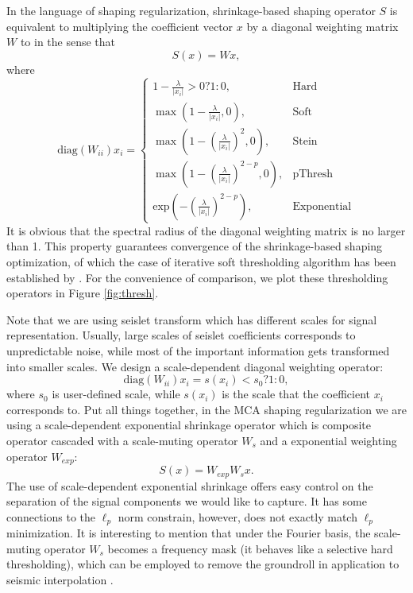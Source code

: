  In the language of shaping regularization, shrinkage-based shaping operator $S$ is equivalent to multiplying the coefficient vector $x$ by a diagonal weighting matrix $W$ to in the sense that
\begin{equation}
 S(x)=Wx,
\end{equation}
where 
\begin{equation}
 \mathrm{diag}(W_{ii})x_i=
 \begin{cases}
 1-\frac{\lambda}{|x_i|}>0?1:0, & \mathrm{Hard}\\
 \max(1-\frac{\lambda}{|x_i|},0), & \mathrm{Soft}\\
 \max(1-\left(\frac{\lambda}{|x_i|}\right)^2,0), & \mathrm{Stein}\\
 \max(1-\left(\frac{\lambda}{|x_i|}\right)^{2-p},0), & \mathrm{pThresh}\\
 \mathrm{exp}(-(\frac{\lambda}{|x_i|})^{2-p}),& \mathrm{Exponential}
 \end{cases}
\end{equation}
It is obvious that the spectral radius of the diagonal weighting matrix is no larger than 1. This property guarantees convergence of the shrinkage-based shaping optimization, of which the case of iterative soft thresholding algorithm has been established by  \cite{daubechies2004iterative}. For the convenience of comparison, we plot these thresholding operators in Figure \ref{fig:thresh}. 


Note that we are using seislet transform which has different scales for signal representation. Usually, large scales of seislet coefficients corresponds to unpredictable noise, while most of the important information gets transformed into smaller scales. We design a scale-dependent diagonal weighting operator:
\begin{equation}
 \mathrm{diag}(W_{ii})x_i= s(x_i)<s_0?1:0,
\end{equation}
where $s_0$ is user-defined scale, while $s(x_i)$ is the scale that the coefficient $x_i$ corresponds to.  Put all things together, in the MCA shaping regularization we are using a scale-dependent exponential shrinkage operator which is composite operator cascaded with a scale-muting operator $W_{s}$ and a exponential weighting operator $W_{exp}$:
\begin{equation}
 S(x)=W_{exp} W_s x.
\end{equation}
The use of scale-dependent exponential shrinkage offers easy control on the separation of the signal components we would like to capture. It has some connections to the $\ell_p$ norm constrain, however, does not exactly match $\ell_p$ minimization. It is interesting to mention that under the Fourier basis, the scale-muting operator $W_s$ becomes a frequency mask (it behaves like a selective hard thresholding), which can be employed to remove the groundroll in application to seismic interpolation \citep{gholami2014non}.



